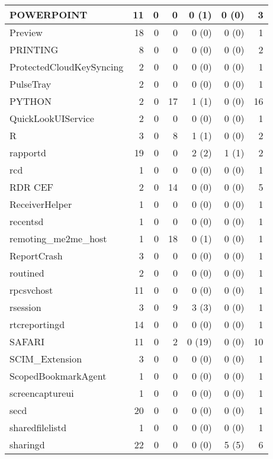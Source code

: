 \begin{adjustwidth}{-2in}{}
\begin{scriptsize}
\begin{longtable}[l]{ l | r | r | r | r | r | r }
    POWERPOINT &  11 &  0 &  0 &  0 (1) &  0 (0) &  3 \\ \hline
    Preview & 18 &  0 &  0 &  0 (0) &  0 (0) &  1 \\ \hline
    PRINTING & 8 &  0 &  0 &  0 (0) &  0 (0) &  2 \\ \hline
    ProtectedCloudKeySyncing & 2 &  0 &  0 &  0 (0) &  0 (0) &  1 \\ \hline
    PulseTray &  2 &  0 &  0 &  0 (0) &  0 (0) &  1 \\ \hline
    PYTHON & 2 &  0 & 17 &  1 (1) &  0 (0) & 16 \\ \hline
    QuickLookUIService & 2 &  0 &  0 &  0 (0) &  0 (0) &  1 \\ \hline
    R &  3 &  0 &  8 &  1 (1) &  0 (0) &  2 \\ \hline
    rapportd &  19 &  0 &  0 &  2 (2) &  1 (1) &  2 \\ \hline
    rcd &  1 &  0 &  0 &  0 (0) &  0 (0) &  1 \\ \hline
    RDR CEF &  2 &  0 & 14 &  0 (0) &  0 (0) &  5 \\ \hline
    ReceiverHelper & 1 &  0 &  0 &  0 (0) &  0 (0) &  1 \\ \hline
    recentsd & 1 &  0 &  0 &  0 (0) &  0 (0) &  1 \\ \hline
    remoting\_me2me\_host &  1 &  0 & 18 &  0 (1) &  0 (0) &  1 \\ \hline
    ReportCrash &  3 &  0 &  0 &  0 (0) &  0 (0) &  1 \\ \hline
    routined & 2 &  0 &  0 &  0 (0) &  0 (0) &  1 \\ \hline
    rpcsvchost &  11 &  0 &  0 &  0 (0) &  0 (0) &  1 \\ \hline
    rsession & 3 &  0 &  9 &  3 (3) &  0 (0) &  1 \\ \hline
    rtcreportingd & 14 &  0 &  0 &  0 (0) &  0 (0) &  1 \\ \hline
    SAFARI &  11 &  0 &  2 & 0 (19) &  0 (0) & 10 \\ \hline
    SCIM\_Extension & 3 &  0 &  0 &  0 (0) &  0 (0) &  1 \\ \hline
    ScopedBookmarkAgent &  1 &  0 &  0 &  0 (0) &  0 (0) &  1 \\ \hline
    screencaptureui &  1 &  0 &  0 &  0 (0) &  0 (0) &  1 \\ \hline
    secd &  20 &  0 &  0 &  0 (0) &  0 (0) &  1 \\ \hline
    sharedfilelistd &  1 &  0 &  0 &  0 (0) &  0 (0) &  1 \\ \hline
    sharingd &  22 &  0 &  0 &  0 (0) &  5 (5) &  6 \\ \hline

\end{longtable}
\end{scriptsize}
\end{adjustwidth}
